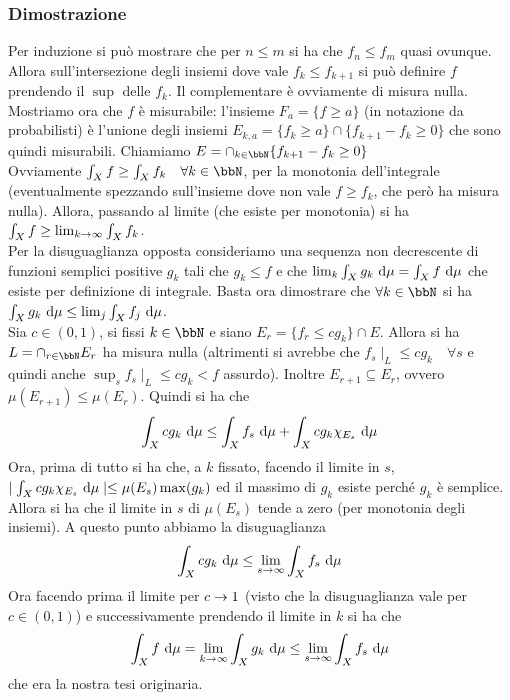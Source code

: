 \documentclass[a4paper,NoNotes,GeneralMath]{stdmdoc}
\begin{document}
	\subsubsection*{Dimostrazione}
	Per induzione si può mostrare che per $n \le m$ si ha che $f_n \le f_m$ quasi ovunque. Allora sull'intersezione degli insiemi dove vale $f_k \le f_{k + 1}$ si può definire $f$ prendendo il $\sup$ delle $f_k$. Il complementare è ovviamente di misura nulla. \\
	Mostriamo ora che $f$ è misurabile: l'insieme $F_a = \{ f \ge a \}$ (in notazione da probabilisti) è l'unione degli insiemi $E_{k, a} = \{ f_k \ge a \} \cap \{ f_{k + 1} - f_k \ge 0 \}$ che sono quindi misurabili. Chiamiamo $E = \cap_{k \in \bbN} \{ f_{k + 1} - f_k \ge 0 \}$ \\
	Ovviamente $ \int_X f \ge \int_X f_k \quad \forall k \in \bbN $, per la monotonia dell'integrale (eventualmente spezzando sull'insieme dove non vale $f \ge f_k$, che però ha misura nulla). Allora, passando al limite (che esiste per monotonia) si ha $ \int_X f \ge \lim_{k \rightarrow \infty} \int_X f_k$. \\
	Per la disuguaglianza opposta consideriamo una sequenza non decrescente di funzioni semplici positive $g_k$ tali che $g_k \le f$ e che $ \lim_k \int_X g_k \de \mu = \int_X f \de \mu$ che esiste per definizione di integrale. Basta ora dimostrare che $\forall k \in \bbN$ si ha $\int_X g_k \de \mu \le \lim_j \int_X f_j \de \mu$. \\
	Sia $c \in (0, 1)$, si fissi $k \in \bbN$ e siano $E_r = \{ f_r \le c g_k \} \cap E$. Allora si ha $L = \cap_{r \in \bbN} E_r$ ha misura nulla (altrimenti si avrebbe che $f_s \mid_L \le c g_k \quad \forall s$ e quindi anche $\sup_s f_s \mid_L \le c g_k < f$ assurdo). Inoltre $E_{r + 1} \subseteq E_r$, ovvero $\mu(E_{r + 1}) \le \mu(E_r)$. Quindi si ha che
	$$ \int_X c g_k \de \mu \le \int_X f_s \de \mu + \int_X c g_k \chi_{E_s} \de \mu $$
	Ora, prima di tutto si ha che, a $k$ fissato, facendo il limite in $s$, $\abs{\int_X c g_k \chi_{E_s} \de \mu} \le \mu(E_s) \max(g_k)$ ed il massimo di $g_k$ esiste perché $g_k$ è semplice. Allora si ha che il limite in $s$ di $\mu(E_s)$ tende a zero (per monotonia degli insiemi). A questo punto abbiamo la disuguaglianza
	$$ \int_X c g_k \de \mu \le \lim_{s \rar \infty} \int_X f_s \de \mu $$
	Ora facendo prima il limite per $c \rightarrow 1$ (visto che la disuguaglianza vale per $c \in (0, 1)$) e successivamente prendendo il limite in $k$ si ha che
	$$ \int_X f \de \mu = \lim_{k \rar \infty} \int_X g_k \de \mu \le \lim_{s \rar \infty} \int_X f_s \de \mu $$
	che era la nostra tesi originaria.
	
\end{document}
